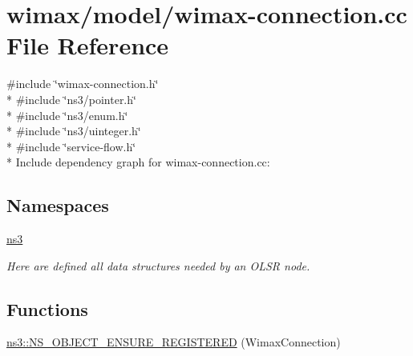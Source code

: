 \hypertarget{wimax-connection_8cc}{}\section{wimax/model/wimax-\/connection.cc File Reference}
\label{wimax-connection_8cc}
{\ttfamily \#include \char`\"{}wimax-\/connection.\+h\char`\"{}}\\*
{\ttfamily \#include \char`\"{}ns3/pointer.\+h\char`\"{}}\\*
{\ttfamily \#include \char`\"{}ns3/enum.\+h\char`\"{}}\\*
{\ttfamily \#include \char`\"{}ns3/uinteger.\+h\char`\"{}}\\*
{\ttfamily \#include \char`\"{}service-\/flow.\+h\char`\"{}}\\*
Include dependency graph for wimax-\/connection.cc\+:
\subsection*{Namespaces}
\begin{DoxyCompactItemize}
\item 
 \hyperlink{namespacens3}{ns3}
\begin{DoxyCompactList}\small\item\em Here are defined all data structures needed by an O\+L\+SR node. \end{DoxyCompactList}\end{DoxyCompactItemize}
\subsection*{Functions}
\begin{DoxyCompactItemize}
\item 
\hyperlink{namespacens3_aaee75640a31f1401ba2287e1872cc78e}{ns3\+::\+N\+S\+\_\+\+O\+B\+J\+E\+C\+T\+\_\+\+E\+N\+S\+U\+R\+E\+\_\+\+R\+E\+G\+I\+S\+T\+E\+R\+ED} (Wimax\+Connection)
\end{DoxyCompactItemize}
